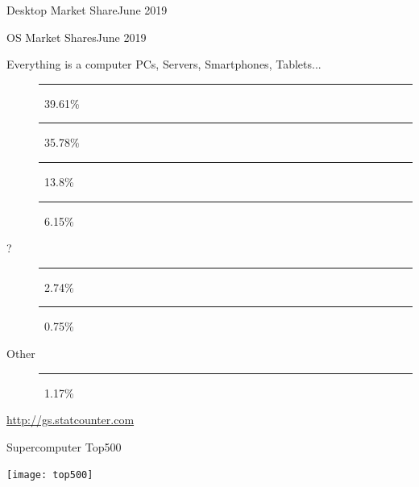 \begin{frame}{Desktop Market Share}{June 2019}
\end{frame}

\begin{frame}{OS Market Shares}{June 2019}
  \begin{block}{Everything is a computer}
    PCs, Servers, Smartphones, Tablets...
    \begin{description}
    \item[\android] \textcolor{Green}{\rule{.3961\textwidth}{2mm}}\,
      39.61\%
    \item[\win] \textcolor{SkyBlue}{\rule{.3578\textwidth}{2mm}}\, 35.78\%
    \item[{\iOS}] \textcolor{orange}{\rule{.138\textwidth}{2mm}}\, 13.8\%
    \item[\apple] \textcolor{LightGray}{\rule{.0615\textwidth}{2mm}}\, 6.15\%
    \item[?] \textcolor{gray}{\rule{.0274\textwidth}{2mm}}\, 2.74\%
    \item[\linux] \rule{.0075\textwidth}{2mm}\, 0.75\%
    \item[Other] \textcolor{gray}{\rule{.0117\textwidth}{2mm}}\, 1.17\%
    \end{description}
  \end{block}
  \begin{flushright}
    \tiny \url{http://gs.statcounter.com}
  \end{flushright}
\end{frame}

\begin{frame}{Supercomputer Top500}
\begin{center}
  \texttt{[image: top500]}
\end{center}
\end{frame}

